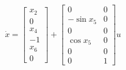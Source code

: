 \begin{equation}
  \dot{x} = \begin{bmatrix} x_2 \\ 0 \\ x_4 \\ -1 \\ x_6 \\ 0 \end{bmatrix} +
  \begin{bmatrix}
    0 & 0 \\
    -\sin x_5 & 0 \\
    0 & 0 \\
    \cos x_5 & 0 \\
    0 & 0 \\
    0 & 1
  \end{bmatrix}
  u
  \nonumber
\end{equation}
